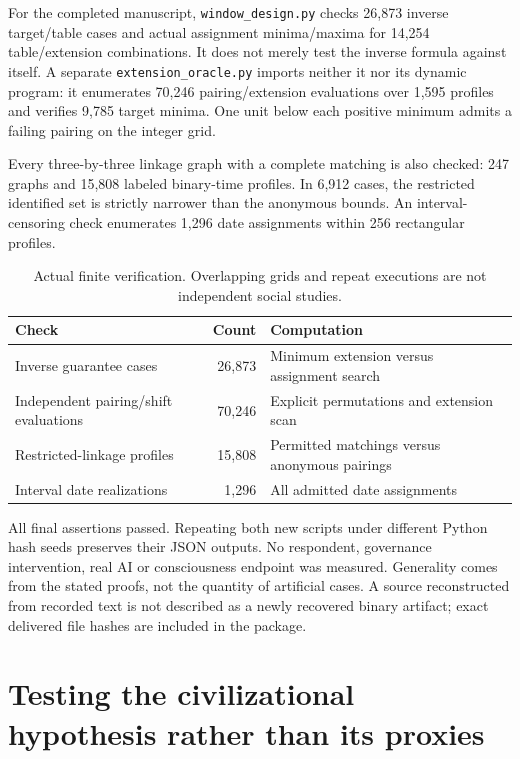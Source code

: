 \documentclass[11pt,a4paper]{article}
\theoremstyle{definition}\newtheorem{definition}{Definition}
\begin{document}
For the completed manuscript, \texttt{window\_design.py} checks 26,873 inverse target/table cases and actual assignment minima/maxima for 14,254 table/extension combinations. It does not merely test the inverse formula against itself. A separate \texttt{extension\_oracle.py} imports neither it nor its dynamic program: it enumerates 70,246 pairing/extension evaluations over 1,595 profiles and verifies 9,785 target minima. One unit below each positive minimum admits a failing pairing on the integer grid.

Every three-by-three linkage graph with a complete matching is also checked: 247 graphs and 15,808 labeled binary-time profiles. In 6,912 cases, the restricted identified set is strictly narrower than the anonymous bounds. An interval-censoring check enumerates 1,296 date assignments within 256 rectangular profiles.

\begin{table}[ht]
\centering\small
\caption{Actual finite verification. Overlapping grids and repeat executions are not independent social studies.}
\begin{tabularx}{\linewidth}{@{}XrX@{}}\toprule
Check & Count & Computation\\\midrule
Inverse guarantee cases &26,873&Minimum extension versus assignment search\\
Independent pairing/shift evaluations &70,246&Explicit permutations and extension scan\\
Restricted-linkage profiles &15,808&Permitted matchings versus anonymous pairings\\
Interval date realizations &1,296&All admitted date assignments\\\bottomrule
\end{tabularx}
\end{table}
All final assertions passed. Repeating both new scripts under different Python hash seeds preserves their JSON outputs. No respondent, governance intervention, real AI or consciousness endpoint was measured. Generality comes from the stated proofs, not the quantity of artificial cases. A source reconstructed from recorded text is not described as a newly recovered binary artifact; exact delivered file hashes are included in the package.

\section{Testing the civilizational hypothesis rather than its proxies}
\label{sec:empirical}
\end{document}

